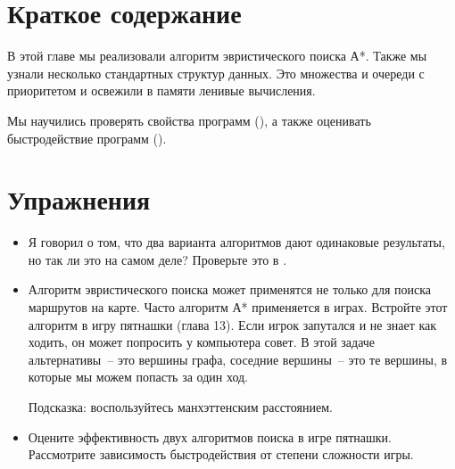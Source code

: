 \section{Краткое содержание}

В этой главе мы реализовали алгоритм эвристического поиска А*.
Также мы узнали несколько стандартных структур данных.
Это множества и очереди с приоритетом и освежили в памяти
ленивые вычисления. 

Мы научились проверять свойства программ (), а 
также оценивать быстродействие программ ().  

\section{Упражнения}

\begin{itemize}

\item Я говорил о том, что два варианта алгоритмов дают 
одинаковые результаты, но так ли это на самом деле? 
Проверьте это в .

\item Алгоритм эвристического поиска может применятся
не только для поиска маршрутов на карте. Часто алгоритм А*
применяется в играх. Встройте этот алгоритм в игру пятнашки (глава 13).
Если игрок запутался и не знает как ходить, он может попросить у 
компьютера совет. В этой задаче альтернативы~-- это вершины
графа, соседние вершины~-- это те вершины, в которые
мы можем попасть за один ход.

Подсказка: воспользуйтесь манхэттенским расстоянием.

\item Оцените эффективность двух алгоритмов поиска
в игре пятнашки. Рассмотрите зависимость быстродействия
от степени сложности игры.

\end{itemize}

